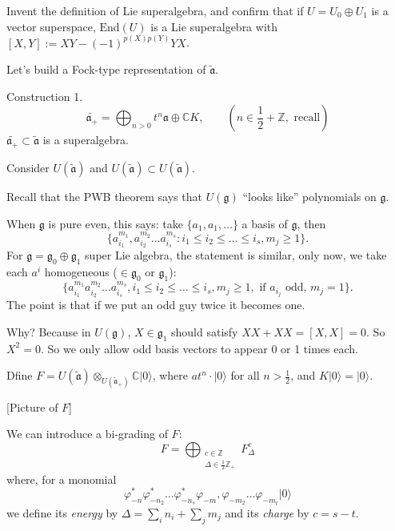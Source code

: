 \begin{exercise}
\label{exercise-Lie-superalgebra}
Invent the definition of Lie superalgebra,
and confirm that if $U=U_0 \oplus U_1$ 
is a vector superspace,
$\text{End}(U)$ is a Lie superalgebra
with $[X,Y]:=XY-(-1)^{p(X)p(Y)}YX$.
\end{exercise}

\medskip\noindent
Let's build a Fock-type representation of $\tilde{\mathfrak{a}}$.

Construction 1.
$$
\tilde{\mathfrak{a}_+}=
\bigoplus_{n>0}t^n\mathfrak{a}\oplus\mathbb{C}K,
\qquad (n \in \frac{1}{2}+\mathbb{Z},\text{ recall})
$$
$\tilde{\mathfrak{a}_+}\subset \tilde{\mathfrak{a}}$ is
a superalgebra.

Consider $U(\tilde{\mathfrak{a}})$
and $U(\tilde{\mathfrak{a}})\subset U(\tilde{\mathfrak{a}})$.

Recall that the PWB theorem says
that $U(\mathfrak{g})$ ``looks like''
polynomials on $\mathfrak{g}$.

When $\mathfrak{g}$ is pure even,
this says:
take $\{a_1,a_1,\ldots\}$ a basis of $\mathfrak{g}$,
then
$$
\{a_{i_1}^{m_1},a_{i_2}^{m_2}\ldots a_{i_s}^{m_s}:
i_1\leq i_2\leq \ldots\leq i_s,m_j \geq 1\}.
$$
For $\mathfrak{g}=\mathfrak{g}_0 \oplus \mathfrak{g}_1$
super Lie algebra,
the statement is similar,
only now, we take each $a^i$ homogeneous
($\in \mathfrak{g}_0$ or $\mathfrak{g}_1$):
$$
\{a_{i_1}^{m_1}a_{i_2}^{m_2}\ldots a_{i_s}^{m_s},
i_1\leq i_2 \leq \ldots \leq i_s, m_j\geq 1,
\text{ if }a_{i_j}\text{ odd, }m_j=1\}.
$$
The point is that if we put an odd guy
twice it becomes one.

Why? Because in $U(\mathfrak{g})$, $X \in \mathfrak{g}_1$ should
satisfy $X X + X X=[X,X]=0$.
So  $X^2=0$. So we only allow
odd basis vectors to appear 0 or 1 times each.

\medskip\noindent
Dfine $F=U(\tilde{\mathfrak{a}})\otimes_{U(\tilde{\mathfrak{a}}_+)}
\mathbb{C}|0\rangle$,
where $at^n\cdot|0\rangle$ for all $n>\frac{1}{2}$, and
$K|0\rangle=|0\rangle$.

[Picture of $F$]

We can introduce a bi-grading of $F$:
$$
F=\bigoplus_{\substack{c \in \mathbb{Z} \\ \Delta \in \frac{1}{2}\mathbb{Z}_+}}
F_\Delta^c
$$
where, for a monomial
$$
\varphi^*_{-n}\varphi^*_{-n_2}\ldots \varphi_{-n_s}^*
\varphi_{-m},\varphi_{-m_2}\ldots \varphi_{-m_t}|0\rangle
$$
we define its {\it energy} by
$\Delta=\sum_in_i+\sum_jm_j$ 
and its {\it charge} by $c=s-t$.

